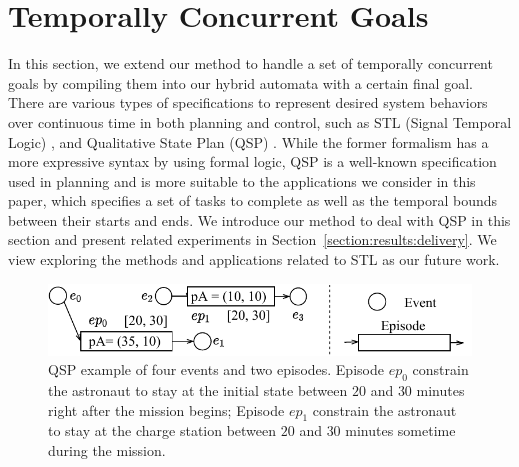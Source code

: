 \documentclass[sigconf]{acmart}
\newcommand{\true}{\mathsf{true}}
\begin{document}
\section{Temporally Concurrent Goals}\label{section:multiple}
In this section, we extend our method to handle a set of temporally concurrent goals by compiling them into our hybrid automata with a certain final goal. There are various types of specifications to represent desired system behaviors over continuous time in both planning and control, such as STL (Signal Temporal Logic) \cite{maler2004monitoring}, and Qualitative State Plan (QSP) \cite{hoffmann2001ff}. While the former formalism has a more expressive syntax by using formal logic, QSP is a well-known specification used in planning and is more suitable to the applications we consider in this paper, which specifies a set of tasks to complete as well as the temporal bounds between their starts and ends. We introduce our method to deal with QSP in this section and present related experiments in Section~\ref{section:results:delivery}. We view exploring the methods and applications related to STL as our future work.


\begin{figure}[ht!]
\centering
\includegraphics[width=0.95\columnwidth]{images/qsp.pdf}
\caption{\small QSP example of four events and two episodes. Episode $ep_0$ constrain the astronaut to stay at the initial state between $20$ and $30$ minutes right after the mission begins; Episode $ep_1$ constrain the astronaut to stay at the charge station between $20$ and $30$ minutes sometime during the mission.}
\label{fig:qsp}
\end{figure} 
\end{document}
